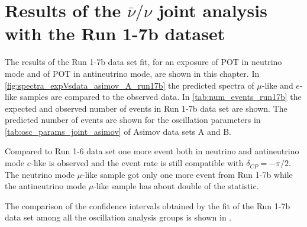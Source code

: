 
\clearpage

\section {Results of the $\bar{\nu}/\nu$ joint analysis with the Run 1-7b dataset}
\label{sec:results_run17b}

The results of the Run 1-7b data set fit,
for an exposure 
of \TotalPotNuRunOneSevenB POT in neutrino mode
and
of \TotalPotNuBarRunOneSevenB POT in antineutrino mode, 
are shown in this chapter.
In \cref{fig:spectra_expVsdata_asimov_A_run17b} the predicted spectra of $\mu$-like and $e$-like samples
are compared to the observed data.
In \cref{tab:num_events_run17b} the expected and observed number of events in Run 1-7b data set are shown.
The predicted number of events are shown for the oscillation parameters in \cref{tab:osc_params_joint_asimov}
of Asimov data sets A and B.

Compared to Run 1-6 data set one more event both in neutrino and antineutrino mode $e$-like is observed
and the event rate is still compatible with $\delta_{CP} = -\pi/2$.
The neutrino mode $\mu$-like sample got only one more event from Run 1-7b
while the antineutrino mode $\mu$-like sample has about double of the statistic.

The comparison of the confidence intervals obtained by the fit of the Run 1-7b data set
among all the oscillation analysis groups is shown in \cite{Mach3JointFitRun16}.

